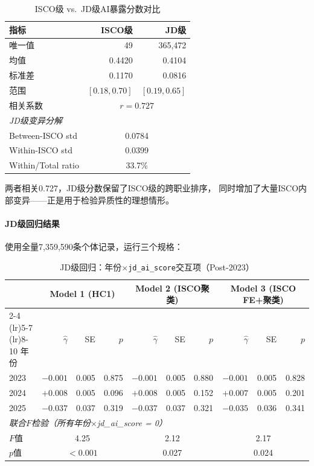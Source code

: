 \documentclass[12pt,a4paper]{ctexart}
\begin{document}
\begin{table}[h!]
\centering
\caption{ISCO级 vs.\ JD级AI暴露分数对比}
\label{tab:isco_vs_jd}
\small
\begin{tabular}{lrr}
\toprule
指标 & ISCO级 & JD级 \\
\midrule
唯一值 & 49 & 365,472 \\
均值 & 0.4420 & 0.4104 \\
标准差 & 0.1170 & 0.0816 \\
范围 & $[0.18, 0.70]$ & $[0.19, 0.65]$ \\
相关系数 & \multicolumn{2}{c}{$r = 0.727$} \\
\midrule
\multicolumn{3}{l}{\textit{JD级变异分解}} \\
\quad Between-ISCO std & \multicolumn{2}{c}{0.0784} \\
\quad Within-ISCO std & \multicolumn{2}{c}{0.0399} \\
\quad Within/Total ratio & \multicolumn{2}{c}{33.7\%} \\
\bottomrule
\end{tabular}
\end{table}

两者相关0.727，JD级分数保留了ISCO级的跨职业排序，
同时增加了大量ISCO内部变异——正是用于检验异质性的理想情形。

\paragraph{JD级回归结果}

使用全量7,359,590条个体记录，运行三个规格：

\begin{table}[h!]
\centering
\caption{JD级回归：年份$\times$\texttt{jd\_ai\_score}交互项（Post-2023）}
\label{tab:jd_regression}
\small
\begin{tabular}{l rrr rrr rrr}
\toprule
& \multicolumn{3}{c}{Model 1 (HC1)} & \multicolumn{3}{c}{Model 2 (ISCO聚类)} & \multicolumn{3}{c}{Model 3 (ISCO FE+聚类)} \\
\cmidrule(lr){2-4} \cmidrule(lr){5-7} \cmidrule(lr){8-10}
年份 & $\hat{\gamma}$ & SE & $p$ & $\hat{\gamma}$ & SE & $p$ & $\hat{\gamma}$ & SE & $p$ \\
\midrule
2023 & $-0.001$ & 0.005 & 0.875 & $-0.001$ & 0.005 & 0.880 & $-0.001$ & 0.005 & 0.828 \\
2024 & $+0.008$ & 0.005 & 0.096 & $+0.008$ & 0.005 & 0.152 & $+0.007$ & 0.005 & 0.201 \\
2025 & $-0.037$ & 0.037 & 0.319 & $-0.037$ & 0.037 & 0.321 & $-0.035$ & 0.036 & 0.341 \\
\midrule
\multicolumn{10}{l}{\textit{联合$F$检验（所有年份$\times$jd\_ai\_score = 0）}} \\
$F$值 & \multicolumn{3}{c}{4.25} & \multicolumn{3}{c}{2.12} & \multicolumn{3}{c}{2.17} \\
$p$值 & \multicolumn{3}{c}{$<0.001$} & \multicolumn{3}{c}{0.027} & \multicolumn{3}{c}{0.024} \\
\bottomrule
\end{tabular}
\end{table}
\end{document}
